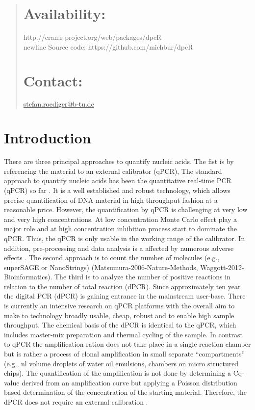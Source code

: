 \documentclass{bioinfo}
\begin{document}
\begin{abstract}
\section{Availability:}
http://cran.r-project.org/web/packages/dpcR\\newline
Source code: https://github.com/michbur/dpcR\

\section{Contact:} \href{stefan.roediger@b-tu.de}{stefan.roediger@b-tu.de}
\end{abstract}

\section{Introduction}
There are three principal approaches to quantify nucleic acids. The fist is by 
referencing the material to an external calibrator (qPCR), The standard approach 
to quantify nucleic acids has been the quantitative real-time PCR (qPCR) so far 
\cite{pabinger_survey_2014}. It is a well established and robust technology, 
which allows precise quantification of DNA material in high throughput fashion 
at a reasonable price. However, the quantification by qPCR is challenging at 
very low and very high concentrations. At low concentration Monte Carlo effect 
play a major role and at high concentration inhibition process start to dominate 
the qPCR. Thus, the qPCR is only usable in the working range of the calibrator. 
In addition, pre-processing and data analysis is a affected by numerous adverse 
effects \cite{spiess_impact_2015}. The second approach is to count the number of 
molecules (e.g., superSAGE or NanoStrings) (Matsumura-2006-Nature-Methods, 
Waggott-2012-Bioinformatics). The third is to analyze the number of positive 
reactions in relation to the number of total reaction (dPCR). Since 
approximately ten year the digital PCR (dPCR) is gaining entrance in the 
mainstream user-base. There is currently an intensive research on qPCR platforms 
with the overall aim to make to technology broadly usable, cheap, robust and to 
enable high sample throughput. The chemical basis of the dPCR is identical to 
the qPCR, which includes master-mix preparation and thermal cycling of the 
sample. In contrast to qPCR the amplification ration does not take place in a 
single reaction chamber but is rather a process of clonal amplification in small 
separate ``compartments'' (e.g., nl volume droplets of water oil emulsions, 
chambers on micro structured chips). The quantification of the amplification is 
not done by determining a Cq-value derived from an amplification curve but 
applying a Poisson distribution based determination of the concentration of the 
starting material. Therefore, the dPCR does not require an external calibration 
\cite{selck_increased_2013, rodiger_r_2015}.
\end{document}

